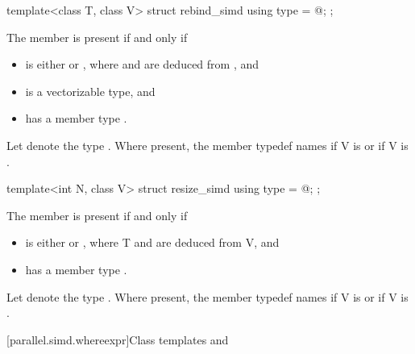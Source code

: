 \begin{itemdecl}
template<class T, class V> struct rebind_simd { using type = @\seebelow@; };
\end{itemdecl}

\begin{itemdescr}
  \pnum
  The member  is present if and only if
  \begin{itemize}
    \item {} is either  or , where  and  are deduced from , and
    \item {} is a vectorizable type, and
    \item {} has a member type .
  \end{itemize}

  \pnum
  Let  denote the type .
  Where present, the member typedef  names
   if \tcode V is  or
   if \tcode V is .
\end{itemdescr}

\begin{itemdecl}
template<int N, class V> struct resize_simd { using type = @\seebelow@; };
\end{itemdecl}

\begin{itemdescr}
  \pnum
  The member  is present if and only if
  \begin{itemize}
    \item {} is either  or , where \tcode T and  are deduced from \tcode V, and
    \item {} has a member type .
  \end{itemize}

  \pnum
  Let  denote the type .
  Where present, the member typedef  names  if \tcode V is  or  if \tcode V is .
\end{itemdescr}

[parallel.simd.whereexpr]{Class templates  and }

